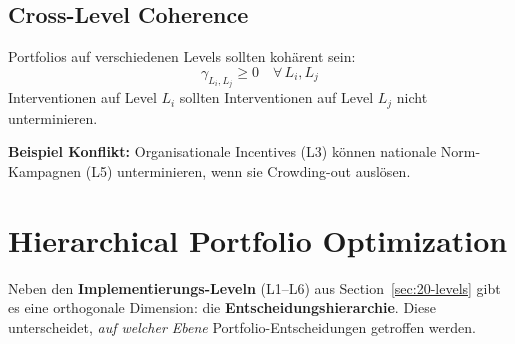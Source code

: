 \subsection{Cross-Level Coherence}

\begin{theorem}
\label{thm:20-cross-level}
Portfolios auf verschiedenen Levels sollten kohärent sein:
\begin{equation}
\gamma_{L_i, L_j} \geq 0 \quad \forall \, L_i, L_j
\label{eq:20-cross-level}
\end{equation}
Interventionen auf Level $L_i$ sollten Interventionen auf Level $L_j$ nicht unterminieren.
\end{theorem}

\textbf{Beispiel Konflikt:} Organisationale Incentives (L3) können nationale Norm-Kampagnen (L5) unterminieren, wenn sie Crowding-out auslösen.


\section{Hierarchical Portfolio Optimization}
\label{sec:20-hierarchical}

Neben den \textbf{Implementierungs-Leveln} (L1--L6) aus Section~\ref{sec:20-levels} gibt es eine orthogonale Dimension: die \textbf{Entscheidungshierarchie}. Diese unterscheidet, \textit{auf welcher Ebene} Portfolio-Entscheidungen getroffen werden.

